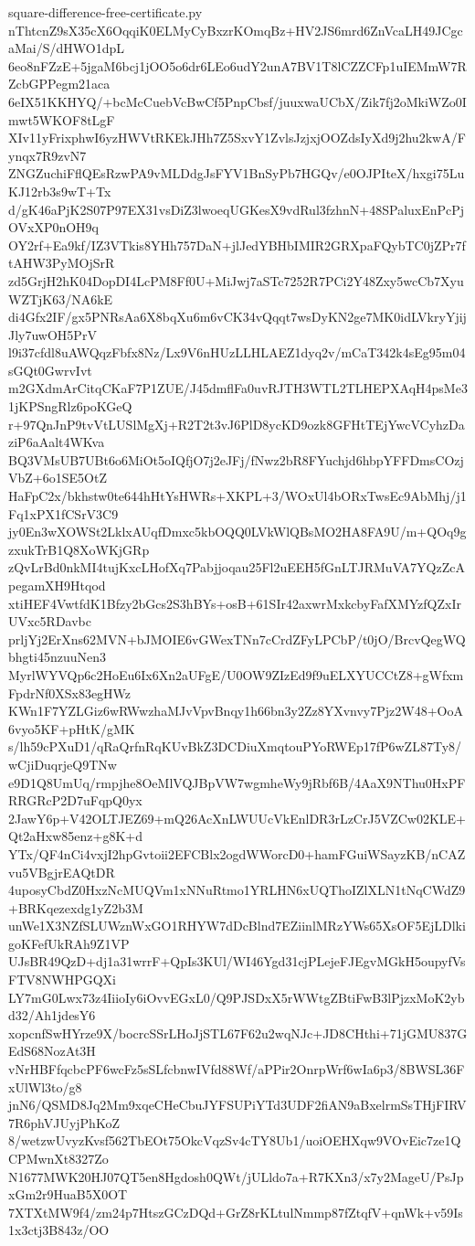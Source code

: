 \documentclass[11pt]{article}
\theoremstyle{definition}
\theoremstyle{remark}
\begin{document}
\begin{filecontents*}[overwrite]{square-difference-free-certificate.py}
nThtcnZ9sX35cX6OqqiK0ELMyCyBxzrKOmqBz+HV2JS6mrd6ZnVcaLH49JCgcaMai/S/dHWO1dpL
6eo8nFZzE+5jgaM6bcj1jOO5o6dr6LEo6udY2unA7BV1T8lCZZCFp1uIEMmW7RZcbGPPegm21aca
6eIX51KKHYQ/+bcMcCuebVcBwCf5PnpCbsf/juuxwaUCbX/Zik7fj2oMkiWZo0Imwt5WKOF8tLgF
XIv11yFrixphwI6yzHWVtRKEkJHh7Z5SxvY1ZvlsJzjxjOOZdsIyXd9j2hu2kwA/Fynqx7R9zvN7
ZNGZuchiFflQEsRzwPA9vMLDdgJsFYV1BnSyPb7HGQv/e0OJPIteX/hxgi75LuKJ12rb3s9wT+Tx
d/gK46aPjK2S07P97EX31vsDiZ3lwoeqUGKesX9vdRul3fzhnN+48SPaluxEnPcPjOVxXP0nOH9q
OY2rf+Ea9kf/IZ3VTkis8YHh757DaN+jlJedYBHbIMIR2GRXpaFQybTC0jZPr7ftAHW3PyMOjSrR
zd5GrjH2hK04DopDI4LcPM8Ff0U+MiJwj7aSTc7252R7PCi2Y48Zxy5wcCb7XyuWZTjK63/NA6kE
di4Gfx2IF/gx5PNRsAa6X8bqXu6m6vCK34vQqqt7wsDyKN2ge7MK0idLVkryYjijJly7uwOH5PrV
l9i37cfdl8uAWQqzFbfx8Nz/Lx9V6nHUzLLHLAEZ1dyq2v/mCaT342k4sEg95m04sGQt0GwrvIvt
m2GXdmArCitqCKaF7P1ZUE/J45dmflFa0uvRJTH3WTL2TLHEPXAqH4psMe31jKPSngRlz6poKGeQ
r+97QnJnP9tvVtLUSlMgXj+R2T2t3vJ6PlD8ycKD9ozk8GFHtTEjYwcVCyhzDaziP6aAalt4WKva
BQ3VMsUB7UBt6o6MiOt5oIQfjO7j2eJFj/fNwz2bR8FYuchjd6hbpYFFDmsCOzjVbZ+6o1SE5OtZ
HaFpC2x/bkhstw0te644hHtYsHWRs+XKPL+3/WOxUl4bORxTwsEc9AbMhj/j1Fq1xPX1fCSrV3C9
jy0En3wXOWSt2LklxAUqfDmxc5kbOQQ0LVkWlQBsMO2HA8FA9U/m+QOq9gzxukTrB1Q8XoWKjGRp
zQvLrBd0nkMI4tujKxcLHofXq7Pabjjoqau25Fl2uEEH5fGnLTJRMuVA7YQzZcApegamXH9Htqod
xtiHEF4VwtfdK1Bfzy2bGcs2S3hBYs+osB+61SIr42axwrMxkcbyFafXMYzfQZxIrUVxc5RDavbc
prljYj2ErXns62MVN+bJMOIE6vGWexTNn7cCrdZFyLPCbP/t0jO/BrcvQegWQbhgti45nzuuNen3
MyrlWYVQp6c2HoEu6Ix6Xn2aUFgE/U0OW9ZIzEd9f9uELXYUCCtZ8+gWfxmFpdrNf0XSx83egHWz
KWn1F7YZLGiz6wRWwzhaMJvVpvBnqy1h66bn3y2Zz8YXvnvy7Pjz2W48+OoA6vyo5KF+pHtK/gMK
s/lh59cPXuD1/qRaQrfnRqKUvBkZ3DCDiuXmqtouPYoRWEp17fP6wZL87Ty8/wCjiDuqrjeQ9TNw
e9D1Q8UmUq/rmpjhe8OeMlVQJBpVW7wgmheWy9jRbf6B/4AaX9NThu0HxPFRRGRcP2D7uFqpQ0yx
2JawY6p+V42OLTJEZ69+mQ26AcXnLWUUcVkEnlDR3rLzCrJ5VZCw02KLE+Qt2aHxw85enz+g8K+d
YTx/QF4nCi4vxjI2hpGvtoii2EFCBlx2ogdWWorcD0+hamFGuiWSayzKB/nCAZvu5VBgjrEAQtDR
4uposyCbdZ0HxzNcMUQVm1xNNuRtmo1YRLHN6xUQThoIZlXLN1tNqCWdZ9+BRKqezexdg1yZ2b3M
unWe1X3NZfSLUWznWxGO1RHYW7dDcBlnd7EZiinlMRzYWs65XsOF5EjLDlkigoKFefUkRAh9Z1VP
UJsBR49QzD+dj1a31wrrF+QpIs3KUl/WI46Ygd31cjPLejeFJEgvMGkH5oupyfVsFTV8NWHPGQXi
LY7mG0Lwx73z4IiioIy6iOvvEGxL0/Q9PJSDxX5rWWtgZBtiFwB3lPjzxMoK2ybd32/Ah1jdesY6
xopcnfSwHYrze9X/bocrcSSrLHoJjSTL67F62u2wqNJc+JD8CHthi+71jGMU837GEdS68NozAt3H
vNrHBFfqcbcPF6wcFz5sSLfcbnwIVfd88Wf/aPPir2OnrpWrf6wIa6p3/8BWSL36FxUlWl3to/g8
jnN6/QSMD8Jq2Mm9xqeCHeCbuJYFSUPiYTd3UDF2fiAN9aBxelrmSsTHjFIRV7R6phVJUyjPhKoZ
8/wetzwUvyzKvsf562TbEOt75OkcVqzSv4cTY8Ub1/uoiOEHXqw9VOvEic7ze1QCPMwnXt8327Zo
N1677MWK20HJ07QT5en8Hgdosh0QWt/jULldo7a+R7KXn3/x7y2MageU/PsJpxGm2r9HuaB5X0OT
7XTXtMW9f4/zm24p7HtszGCzDQd+GrZ8rKLtulNmmp87fZtqfV+qnWk+v59Is1x3ctj3B843z/OO

\end{filecontents*}
\end{document}
